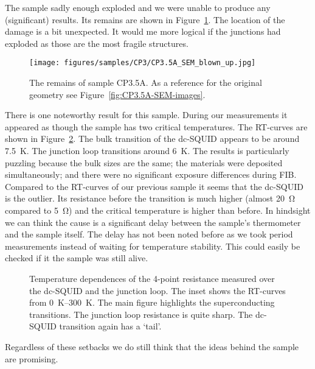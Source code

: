 The sample sadly enough exploded and we were unable to produce any (significant) results. Its remains are shown in Figure~\ref{fig:CP3.5A-remains}. The location of the damage is a bit unexpected. It would me more logical if the junctions had exploded as those are the most fragile structures.

\begin{figure}[ht!]	
	\centering
	\texttt{[image: figures/samples/CP3/CP3.5A\_SEM\_blown\_up.jpg]}
	\caption{The remains of sample CP3.5A. As a reference for the original geometry see Figure~\ref{fig:CP3.5A-SEM-images}.}
	\label{fig:CP3.5A-remains}
\end{figure}

There is one noteworthy result for this sample. During our measurements it appeared as though the sample has two critical temperatures. The RT-curves are shown in Figure~\ref{fig:CP3.5A_RT_curves}. The bulk transition of the dc-SQUID appears to be around \qty{7.5}{\kelvin}. The junction loop transitions around \qty{6}{\kelvin}. The results is particularly puzzling because the bulk sizes are the same; the materials were deposited simultaneously; and there were no significant exposure differences during FIB. Compared to the RT-curves of our previous sample it seems that the dc-SQUID is the outlier. Its resistance before the transition is much higher (almost \qty{20}{\ohm} compared to \qty{5}{\ohm}) and the critical temperature is higher than before. In hindsight we can think the cause is a significant delay between the sample's thermometer and the sample itself. The delay has not been noted before as we took period measurements instead of waiting for temperature stability. This could easily be checked if it the sample was still alive.

\begin{figure}[ht!]
	\centering
	
	\caption{Temperature dependences of the 4-point resistance measured over the dc-SQUID and the junction loop. The inset shows the RT-curves from \qtyrange{0}{300}{\kelvin}. The main figure highlights the superconducting transitions. The junction loop resistance is quite sharp. The dc-SQUID transition again has a `tail'.}
	\label{fig:CP3.5A_RT_curves}
\end{figure}

Regardless of these setbacks we do still think that the ideas behind the sample are promising.